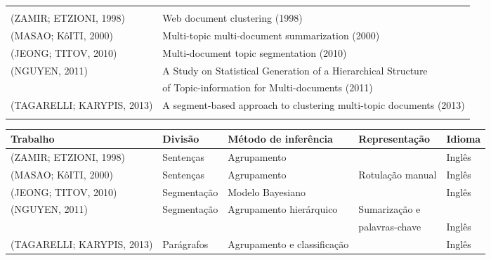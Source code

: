 \begin{table}[!h]
	\centering

	\begin{tabular}{ll} \hline\\
		(ZAMIR; ETZIONI, 1998) &      Web document clustering (1998)   \\ 
		(MASAO; KôITI, 2000) &        Multi-topic multi-document summarization  (2000)  \\ 
		(JEONG; TITOV, 2010) &        Multi-document topic segmentation (2010)  \\ 
		(NGUYEN, 2011) &              A Study on Statistical Generation of a Hierarchical Structure \\ & of Topic-information for Multi-documents (2011)  \\
		(TAGARELLI; KARYPIS, 2013) &  A segment-based approach to clustering multi-topic documents (2013) \\ \\ \hline
	\end{tabular}
\end{table}




\begin{table}[!h]
	\centering

	\begin{tabular}{lllll} \hline
		\textbf{Trabalho} & \textbf{Divisão} & \textbf{Método de inferência}  & \textbf{Representação} & \textbf{Idioma}\\
		\hline\hline

	
	 (ZAMIR; ETZIONI, 1998) &      	Sentenças  & Agrupamento                 & & Inglês \\ \hline
	 (MASAO; KôITI, 2000) &        	Sentenças  & Agrupamento                 & Rotulação manual & Inglês \\ \hline
	 (JEONG; TITOV, 2010) &        	Segmentação   & Modelo Bayesiano            & & Inglês \\ \hline
	 (NGUYEN, 2011) &              	Segmentação  & Agrupamento hierárquico     & Sumarização e \\ &&&palavras-chave& Inglês  \\ \hline
	 (TAGARELLI; KARYPIS, 2013) &  	Parágrafos & Agrupamento e classificação & & Inglês \\ \hline

	\end{tabular}

\end{table}







